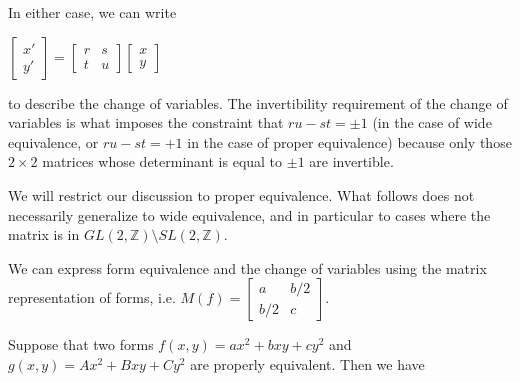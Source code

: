 \documentclass{article}
\theoremstyle{definition}
\theoremstyle{theorem}
\theoremstyle{example}
\theoremstyle{corollary}
\begin{document}
\bigskip

In either case, we can write
\begin{center}
\(\begin{bmatrix} x' \\ y' \end{bmatrix} = \begin{bmatrix} r & s \\ t & u \end{bmatrix} \begin{bmatrix} x \\ y \end{bmatrix}\)
\end{center}
to describe the change of variables. The invertibility requirement of the change of variables is what imposes the constraint that \(ru - st = \pm 1\) (in the case of wide equivalence, or \(ru - st = +1\) in the case of proper equivalence) because only those \(2 \times 2\) matrices whose determinant is equal to \(\pm 1\) are invertible.

\bigskip

We will restrict our discussion to proper equivalence. What follows does not necessarily generalize to wide equivalence, and in particular to cases where the matrix is in \(GL(2, \mathbb{Z}) \setminus SL(2, \mathbb{Z})\).

\bigskip

We can express form equivalence and the change of variables using the matrix representation of forms, i.e. \(M(f) = \begin{bmatrix} a & b/2 \\ b/2 & c \end{bmatrix}\).

\bigskip

Suppose that two forms \(f (x, y) = a x^{2} + b xy + c y^{2}\) and \(g (x, y) = A x^{2} + B xy + C y^{2}\) are properly equivalent. Then we have

\bigskip
\end{document}
